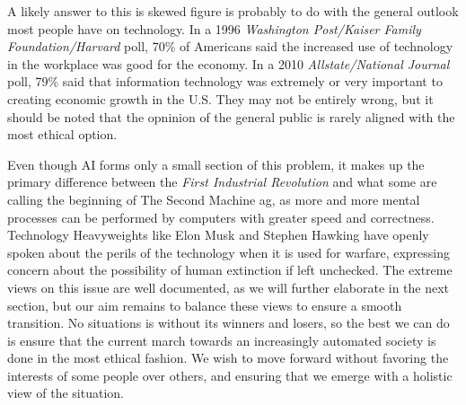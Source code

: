 A likely answer to this is skewed figure is probably to do with the 
general outlook most people have on technology. In a 1996 
\textit{Washington Post/Kaiser Family Foundation/Harvard} poll, 70\% of 
Americans said the increased use of technology in the workplace was good 
for the economy. In a 2010 \textit{Allstate/National Journal} poll, 
79\% said that information technology was extremely or very important 
to creating economic growth in the U.S. They may not be entirely wrong, 
but it should be noted that the opninion of the general public is rarely 
aligned with the most ethical option.

Even though AI forms only a small section of this problem, it makes up 
the primary difference between the \textit{First Industrial Revolution} 
and what some are calling the beginning of The Second Machine ag, as 
more and more mental processes can be performed by computers with 
greater speed and correctness.  Technology Heavyweights like Elon Musk 
and Stephen Hawking have openly spoken about the perils of the 
technology when it is used for warfare\cite{aidangers}, expressing 
concern about the possibility of human extinction if left unchecked. 
The extreme views on this issue are well documented, as we will further 
elaborate in the next section, but our aim remains to balance 
these views to ensure a smooth transition.  No situations is without 
its winners and losers, so the best we can do is ensure that the current 
march towards an increasingly automated society is done in the most 
ethical fashion. We wish to move forward without favoring the interests 
of some people over others, and ensuring that we emerge with a holistic 
view of the situation.

